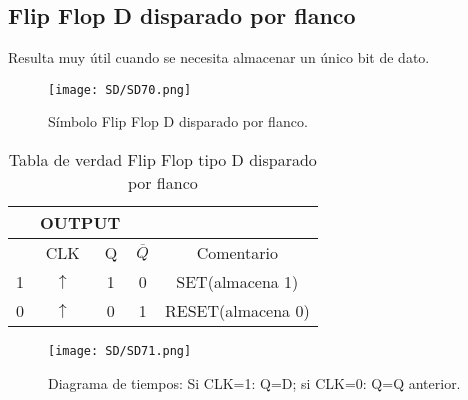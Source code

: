 \documentclass[
	12pt, %
	fleqn, %
	a4paper, %
	oneside, %
]{LegrandOrangeBook}
\begin{document}
\subsection{Flip Flop D disparado por flanco}
Resulta muy útil cuando se necesita almacenar un único bit de dato.
\begin{figure}[H]
\centering
\texttt{[image: SD/SD70.png]}
\caption{Símbolo Flip Flop D disparado por flanco.}
\end{figure}
\begin{table}[H]
\begin{center}
\begin{tabular}{|cc|cc|c|}
\hline
\rowcolor{color1!70}
\multicolumn{2}{|c|}{INPUT}          & \multicolumn{2}{c|}{OUTPUT}             &                   \\ \hline
\rowcolor{color1!50}
\multicolumn{1}{|c|}{D} & CLK        & \multicolumn{1}{c|}{Q} & $\overline{Q}$ & Comentario        \\ \hline
\multicolumn{1}{|c|}{1} & $\uparrow$ & \multicolumn{1}{c|}{1} & 0              & SET(almacena 1)   \\ \hline
\multicolumn{1}{|c|}{0} & $\uparrow$ & \multicolumn{1}{c|}{0} & 1              & RESET(almacena 0) \\ \hline
\end{tabular}
\end{center}
\caption{Tabla de verdad Flip Flop tipo D disparado por flanco}
\end{table}
\begin{figure}[H]
\centering
\texttt{[image: SD/SD71.png]}
\caption{Diagrama de tiempos: Si CLK=1: Q=D; si CLK=0: Q=Q anterior.}
\end{figure}
\end{document}
